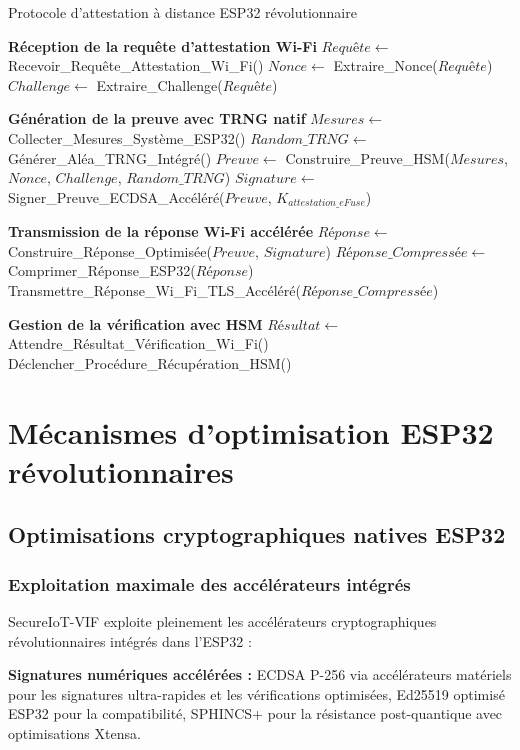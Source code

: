\begin{algorithm}
\caption{Protocole d'attestation à distance ESP32 révolutionnaire}
\label{alg:remote-attestation-esp32}
\begin{algorithmic}[1]
\State \textbf{Réception de la requête d'attestation Wi-Fi}
\State $Requête \leftarrow$ Recevoir\_Requête\_Attestation\_Wi\_Fi()
\State $Nonce \leftarrow$ Extraire\_Nonce($Requête$)
\State $Challenge \leftarrow$ Extraire\_Challenge($Requête$)

\State \textbf{Génération de la preuve avec TRNG natif}
\State $Mesures \leftarrow$ Collecter\_Mesures\_Système\_ESP32()
\State $Random\_TRNG \leftarrow$ Générer\_Aléa\_TRNG\_Intégré()
\State $Preuve \leftarrow$ Construire\_Preuve\_HSM($Mesures$, $Nonce$, $Challenge$, $Random\_TRNG$)
\State $Signature \leftarrow$ Signer\_Preuve\_ECDSA\_Accéléré($Preuve$, $K_{attestation\_eFuse}$)

\State \textbf{Transmission de la réponse Wi-Fi accélérée}
\State $Réponse \leftarrow$ Construire\_Réponse\_Optimisée($Preuve$, $Signature$)
\State $Réponse\_Compressée \leftarrow$ Comprimer\_Réponse\_ESP32($Réponse$)
\State Transmettre\_Réponse\_Wi\_Fi\_TLS\_Accéléré($Réponse\_Compressée$)

\State \textbf{Gestion de la vérification avec HSM}
\State $Résultat \leftarrow$ Attendre\_Résultat\_Vérification\_Wi\_Fi()
    \State Déclencher\_Procédure\_Récupération\_HSM()
\EndIf
\end{algorithmic}
\end{algorithm}

\section{Mécanismes d'optimisation ESP32 révolutionnaires}

\subsection{Optimisations cryptographiques natives ESP32}

\subsubsection{Exploitation maximale des accélérateurs intégrés}

SecureIoT-VIF exploite pleinement les accélérateurs cryptographiques révolutionnaires intégrés dans l'ESP32 :

\textbf{Signatures numériques accélérées :} ECDSA P-256 via accélérateurs matériels pour les signatures ultra-rapides et les vérifications optimisées, Ed25519 optimisé ESP32 pour la compatibilité, SPHINCS+ pour la résistance post-quantique avec optimisations Xtensa.

